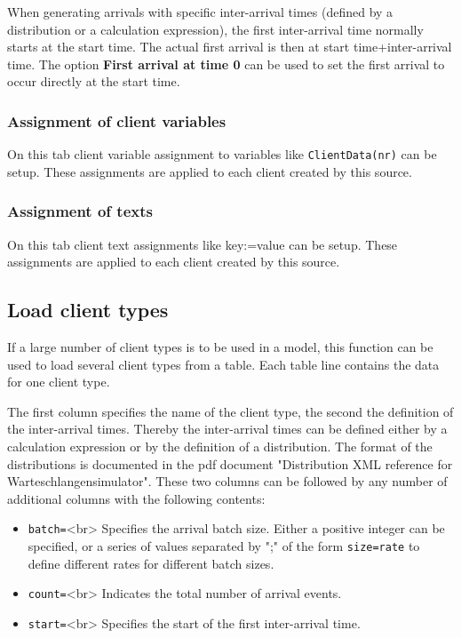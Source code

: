 When generating arrivals with specific inter-arrival times (defined by a distribution
or a calculation expression), the first inter-arrival time normally starts at the start time.
The actual first arrival is then at start time+inter-arrival time. The option
\textbf{First arrival at time 0} can be used to set the first arrival to occur
directly at the start time.

\subsubsection*{Assignment of client variables}

On this tab client variable assignment to variables like \texttt{ClientData(nr)} can be setup.
These assignments are applied to each client created by this source.

\subsubsection*{Assignment of texts}

On this tab client text assignments like key:=value can be setup.
These assignments are applied to each client created by this source.

\subsection*{Load client types}

If a large number of client types is to be used in a model, this function can be used
to load several client types from a table. Each table line contains the data for one client type.

The first column specifies the name of the client type, the second the definition of the inter-arrival times.
Thereby the inter-arrival times can be defined either by a calculation expression or by the definition of a
distribution. The format of the distributions is documented in the pdf document
"Distribution XML reference for Warteschlangensimulator". These two columns can be followed by any number
of additional columns with the following contents:

\begin{itemize}
  \item \texttt{batch=}<br>
  Specifies the arrival batch size. Either a positive integer can be specified, or a series of values separated
  by ";" of the form \texttt{size=rate} to define different rates for different batch sizes. 
  \item \texttt{count=}<br>
  Indicates the total number of arrival events. 
  \item \texttt{start=}<br>
  Specifies the start of the first inter-arrival time. 
\end{itemize}

